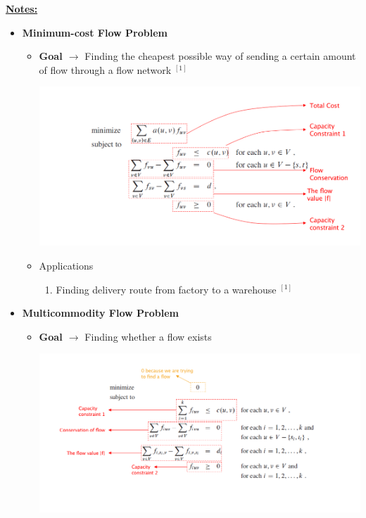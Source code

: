 \documentclass[12pt]{article}
\begin{document}
\begin{enumerate}[1.]
    \underline{\textbf{Notes:}}

    \bigskip

    \begin{itemize}
        \item \textbf{Minimum-cost Flow Problem}

        \begin{itemize}
            \item \textbf{Goal $\to$} Finding the cheapest possible way of sending a
            certain amount of flow through a flow network $^{[1]}$

            \begin{center}
            \includegraphics[width=0.8\linewidth]{images/worksheet_6_solution_19.png}
            \end{center}

            \item Applications

            \begin{enumerate}[1)]
                \item Finding delivery route from factory to a warehouse $^{[1]}$
            \end{enumerate}
        \end{itemize}

        \item \textbf{Multicommodity Flow Problem}

        \begin{itemize}
            \item \textbf{Goal $\to$} Finding whether a flow exists

            \begin{center}
            \includegraphics[width=\linewidth]{images/worksheet_6_solution_20.png}
            \end{center}


\end{itemize}
\end{itemize}
\end{enumerate}
\end{document}
